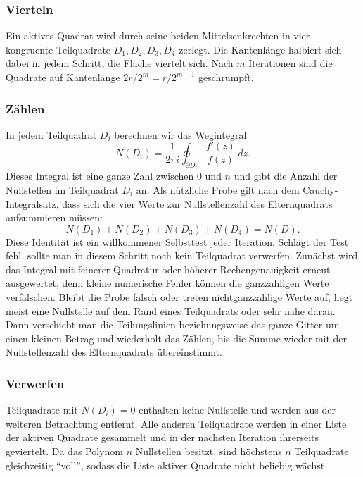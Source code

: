 \subsubsection*{Vierteln}
Ein aktives Quadrat wird durch seine beiden Mittelsenkrechten in vier kongruente
Teilquadrate $D_1, D_2, D_3, D_4$ zerlegt.
Die Kantenlänge halbiert sich dabei in jedem Schritt, die Fläche viertelt sich.
Nach $m$ Iterationen sind die Quadrate auf Kantenlänge $2r/2^m = r/2^{m-1}$
geschrumpft.

\subsubsection*{Zählen}
In jedem Teilquadrat $D_i$ berechnen wir das Wegintegral
\begin{equation}
N(D_i)
=
\frac{1}{2\pi i}
\oint_{\partial D_i}
\frac{f'(z)}{f(z)}
\, dz
.
\label{weyl:eq:teilintegral}
\end{equation}
Dieses Integral ist eine ganze Zahl zwischen $0$ und $n$ und gibt die Anzahl der
Nullstellen im Teilquadrat $D_i$ an.
Als nützliche Probe gilt nach dem Cauchy-Integralsatz, dass sich die vier Werte
zur Nullstellenzahl des Elternquadrats aufsummieren müssen:
\begin{equation}
N(D_1) + N(D_2) + N(D_3) + N(D_4)
=
N(D)
.
\label{weyl:eq:probe}
\end{equation}
Diese Identität ist ein willkommener Selbsttest jeder Iteration.
%
Schlägt der Test fehl, sollte man in diesem Schritt noch kein Teilquadrat verwerfen.
Zunächst wird das Integral mit feinerer Quadratur oder höherer Rechengenauigkeit erneut
ausgewertet, denn kleine numerische Fehler können die ganzzahligen Werte verfälschen.
Bleibt die Probe falsch oder treten nichtganzzahlige Werte auf, liegt meist eine Nullstelle
auf dem Rand eines Teilquadrats oder sehr nahe daran.
Dann verschiebt man die Teilungslinien beziehungsweise das ganze Gitter um einen kleinen
Betrag und wiederholt das Zählen, bis die Summe wieder mit der Nullstellenzahl des
Elternquadrats übereinstimmt.

\subsubsection*{Verwerfen}
Teilquadrate mit $N(D_i) = 0$ enthalten keine Nullstelle und werden aus der weiteren
Betrachtung entfernt.
Alle anderen Teilquadrate werden in einer Liste der aktiven Quadrate gesammelt und
in der nächsten Iteration ihrerseits geviertelt.
Da das Polynom $n$ Nullstellen besitzt, sind höchstens $n$ Teilquadrate gleichzeitig
``voll'', sodass die Liste aktiver Quadrate nicht beliebig wächst.

